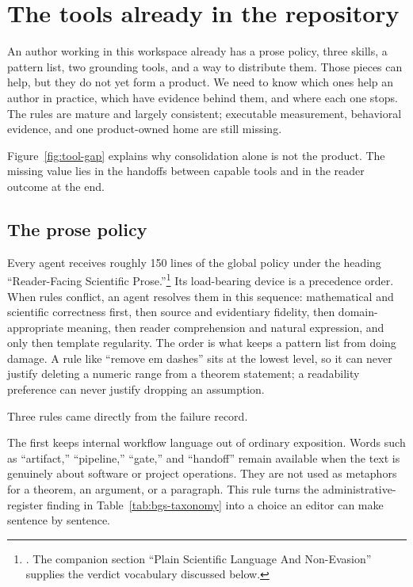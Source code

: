 \chapter{The tools already in the repository}
\label{sec:tools}

An author working in this workspace already has a prose policy, three skills, a
pattern list, two grounding tools, and a way to distribute them. Those pieces
can help, but they do not yet form a product. We need to know which ones help an
author in practice, which have evidence behind them, and where each one stops.
The rules are mature and largely consistent; executable measurement, behavioral
evidence, and one product-owned home are still missing.

Figure~\ref{fig:tool-gap} explains why consolidation alone is not the product.
The missing value lies in the handoffs between capable tools and in the reader
outcome at the end.

\hvFigureToolGap

\section{The prose policy}
\label{sec:tool-policy}

Every agent receives roughly 150 lines of the global policy under the heading
``Reader-Facing Scientific Prose.''\footnote{. The companion section ``Plain Scientific Language And Non-Evasion'' supplies the verdict vocabulary discussed below.}
Its load-bearing device is a precedence order. When rules conflict, an agent
resolves them in this sequence: mathematical and scientific correctness
first, then source and evidentiary fidelity, then domain-appropriate meaning,
then reader comprehension and natural expression, and only then template
regularity. The order is what keeps a pattern list from doing damage. A rule
like ``remove em dashes'' sits at the lowest level, so it can never justify
deleting a numeric range from a theorem statement; a readability preference
can never justify dropping an assumption.

Three rules came directly from the failure record.

The first keeps internal workflow language out of ordinary exposition. Words
such as ``artifact,'' ``pipeline,'' ``gate,'' and ``handoff'' remain available
when the text is genuinely about software or project operations. They are not
used as metaphors for a theorem, an argument, or a paragraph. This rule turns
the administrative-register finding in Table~\ref{tab:bgs-taxonomy} into a
choice an editor can make sentence by sentence.

